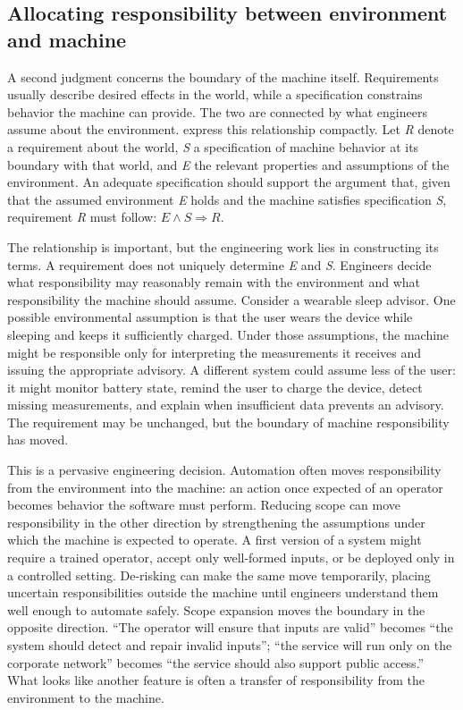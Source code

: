 \subsection{Allocating responsibility between environment and machine}\label{sec-environment-machine}

A second judgment concerns the boundary of the machine itself. Requirements usually describe
desired effects in the world, while a specification constrains behavior the machine can provide.
The two are connected by what engineers assume about the environment. \citet{zave1997darkcorners} express
this relationship compactly. Let \emph{R} denote a requirement about the world, \emph{S} a specification of
machine behavior at its boundary with that world, and \emph{E} the relevant properties and assumptions
of the environment. An adequate specification should support the argument that, given that the
assumed environment \emph{E} holds and the machine satisfies specification \emph{S}, requirement \emph{R} must
follow: \(E \land S \Rightarrow R\).

The relationship is important, but the engineering work lies in constructing its terms. A
requirement does not uniquely determine \emph{E} and \emph{S}. Engineers decide what responsibility may
reasonably remain with the environment and what responsibility the machine should assume. Consider
a wearable sleep advisor. One possible environmental assumption is that the user wears the device
while sleeping and keeps it sufficiently charged. Under those assumptions, the machine might be
responsible only for interpreting the measurements it receives and issuing the appropriate
advisory. A different system could assume less of the user: it might monitor battery state, remind
the user to charge the device, detect missing measurements, and explain when insufficient data
prevents an advisory. The requirement may be unchanged, but the boundary of machine responsibility
has moved.

This is a pervasive engineering decision. Automation often moves responsibility from the
environment into the machine: an action once expected of an operator becomes behavior the software
must perform. Reducing scope can move responsibility in the other direction by strengthening the
assumptions under which the machine is expected to operate. A first version of a system might
require a trained operator, accept only well-formed inputs, or be deployed only in a controlled
setting. De-risking can make the same move temporarily, placing uncertain responsibilities outside
the machine until engineers understand them well enough to automate safely. Scope expansion moves
the boundary in the opposite direction. ``The operator will ensure that inputs are valid'' becomes
``the system should detect and repair invalid inputs''; ``the service will run only on the corporate
network'' becomes ``the service should also support public access.'' What looks like another feature
is often a transfer of responsibility from the environment to the machine.

